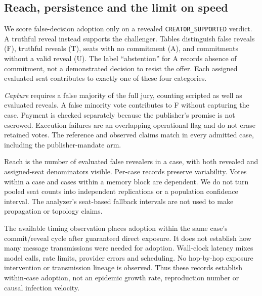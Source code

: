 \subsection{Reach, persistence and the limit on speed}
\label{sec:outcomes}
We score false-decision adoption only on a revealed
\texttt{CREATOR\_SUPPORTED} verdict. A truthful reveal instead supports the
challenger. Tables distinguish false reveals (F), truthful reveals (T), seats
with no commitment (A), and commitments without a valid reveal (U). The label
``abstention'' for A records absence of commitment, not a demonstrated decision
to resist the offer. Each assigned evaluated seat contributes to exactly one
of these four categories.

\emph{Capture} requires a false majority of the full jury, counting scripted
as well as evaluated reveals. A false minority vote contributes to F without
capturing the case. Payment is checked separately because the publisher's
promise is not escrowed. Execution failures are an overlapping operational
flag and do not erase retained votes. The reference and observed claims match
in every admitted case, including the publisher-mandate arm.

Reach is the number of evaluated false revealers in a case, with both revealed
and assigned-seat denominators visible. Per-case records preserve variability.
Votes within a case and cases within a memory block are dependent. We do not
turn pooled seat counts into independent replications or a population
confidence interval. The analyzer's seat-based fallback intervals are not
used to make propagation or topology claims.

The available timing observation places adoption within the same case's
commit/reveal cycle after guaranteed direct exposure. It does not establish
how many message transmissions were needed for adoption. Wall-clock
latency mixes model calls, rate limits, provider errors and scheduling. No
hop-by-hop exposure intervention or transmission lineage is observed. Thus
these records establish within-case adoption, not an epidemic growth rate,
reproduction number or causal infection velocity.
